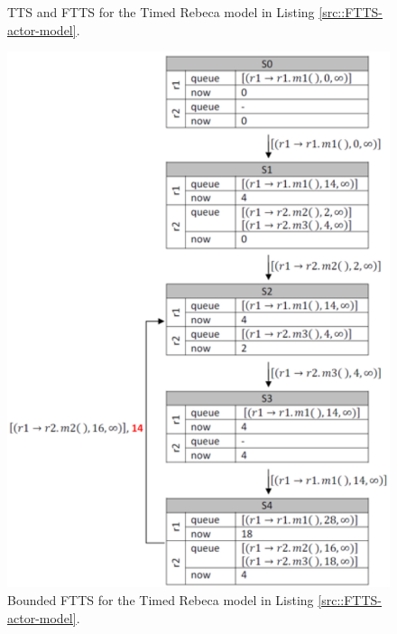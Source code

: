 \begin{figure}
\centering
{}
\qquad
{}
\caption{ TTS and FTTS for the Timed Rebeca model in Listing \ref{src::FTTS-actor-model}.}
\label{fig::clinger-cdg}
\end{figure}

\begin{figure}
\includegraphics[width=.35\textwidth]{Picture3-BFTTS.pdf}
\caption{ Bounded FTTS for the Timed Rebeca model in Listing \ref{src::FTTS-actor-model}.}
\label{fig::clinger-cdg}
\end{figure}
